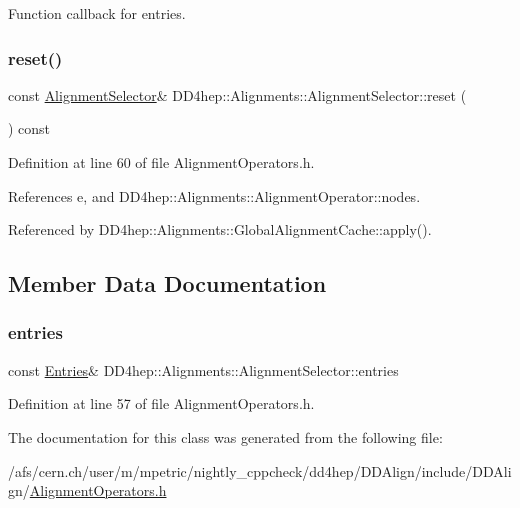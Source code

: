 Function callback for entries. 

\hypertarget{class_d_d4hep_1_1_alignments_1_1_alignment_selector_a590a034cc176ad7c2168d69c88af97f1}{}\label{class_d_d4hep_1_1_alignments_1_1_alignment_selector_a590a034cc176ad7c2168d69c88af97f1} 
\subsubsection{\texorpdfstring{reset()}{reset()}}
{\footnotesize\ttfamily const \hyperlink{class_d_d4hep_1_1_alignments_1_1_alignment_selector}{Alignment\+Selector}\& D\+D4hep\+::\+Alignments\+::\+Alignment\+Selector\+::reset (\begin{DoxyParamCaption}{ }\end{DoxyParamCaption}) const\hspace{0.3cm}{\ttfamily [inline]}}



Definition at line 60 of file Alignment\+Operators.\+h.



References e, and D\+D4hep\+::\+Alignments\+::\+Alignment\+Operator\+::nodes.



Referenced by D\+D4hep\+::\+Alignments\+::\+Global\+Alignment\+Cache\+::apply().



\subsection{Member Data Documentation}
\hypertarget{class_d_d4hep_1_1_alignments_1_1_alignment_selector_ab948717c701b7aff5c744f8624cf8473}{}\label{class_d_d4hep_1_1_alignments_1_1_alignment_selector_ab948717c701b7aff5c744f8624cf8473} 
\subsubsection{\texorpdfstring{entries}{entries}}
{\footnotesize\ttfamily const \hyperlink{class_d_d4hep_1_1_alignments_1_1_alignment_operator_ada83b10531c5774c75f6e8c224f55f4c}{Entries}\& D\+D4hep\+::\+Alignments\+::\+Alignment\+Selector\+::entries}



Definition at line 57 of file Alignment\+Operators.\+h.



The documentation for this class was generated from the following file\+:\begin{DoxyCompactItemize}
\item 
/afs/cern.\+ch/user/m/mpetric/nightly\+\_\+cppcheck/dd4hep/\+D\+D\+Align/include/\+D\+D\+Align/\hyperlink{_alignment_operators_8h}{Alignment\+Operators.\+h}\end{DoxyCompactItemize}
